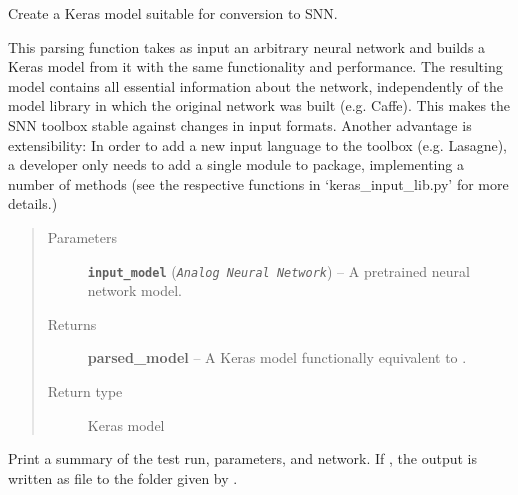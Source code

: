 \documentclass[letterpaper,10pt,english]{sphinxmanual}
\begin{document}

\begin{fulllineitems}
\label{core:core.util.parse}
Create a Keras model suitable for conversion to SNN.

This parsing function takes as input an arbitrary neural network and builds
a Keras model from it with the same functionality and performance.
The resulting model contains all essential information about the network,
independently of the model library in which the original network was built
(e.g. Caffe). This makes the SNN toolbox stable against changes in input
formats. Another advantage is extensibility: In order to add a new input
language to the toolbox (e.g. Lasagne), a developer only needs to add a
single module to  package, implementing a number of methods
(see the respective functions in `keras\_input\_lib.py' for more details.)
\begin{quote}\begin{description}
\item[{Parameters}] \leavevmode
\textbf{\texttt{input\_model}} (\emph{\texttt{Analog Neural Network}}) -- A pretrained neural network model.

\item[{Returns}] \leavevmode
\textbf{parsed\_model} -- A Keras model functionally equivalent to .

\item[{Return type}] \leavevmode
Keras model

\end{description}\end{quote}

\end{fulllineitems}


\begin{fulllineitems}
\label{core:core.util.print_description}
Print a summary of the test run, parameters, and network. If ,
the output is written as  file to the folder given by
.

\end{fulllineitems}

\end{document}
